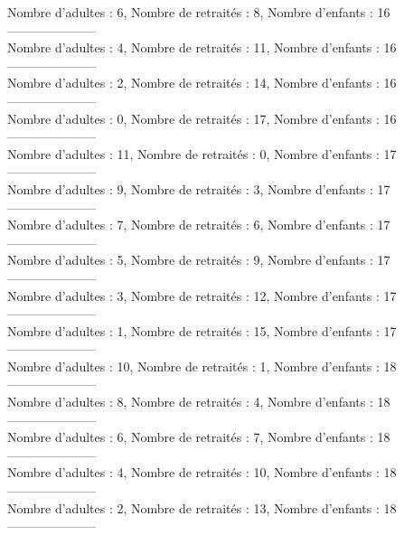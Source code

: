 \documentclass[10pt,a4paper]{article}
\begin{document}
Nombre d'adultes : 6, Nombre de retraités : 8, Nombre d'enfants : 16\\
---------------------\\
Nombre d'adultes : 4, Nombre de retraités : 11, Nombre d'enfants : 16\\
---------------------\\
Nombre d'adultes : 2, Nombre de retraités : 14, Nombre d'enfants : 16\\
---------------------\\
Nombre d'adultes : 0, Nombre de retraités : 17, Nombre d'enfants : 16\\
---------------------\\
Nombre d'adultes : 11, Nombre de retraités : 0, Nombre d'enfants : 17\\
---------------------\\
Nombre d'adultes : 9, Nombre de retraités : 3, Nombre d'enfants : 17\\
---------------------\\
Nombre d'adultes : 7, Nombre de retraités : 6, Nombre d'enfants : 17\\
---------------------\\
Nombre d'adultes : 5, Nombre de retraités : 9, Nombre d'enfants : 17\\
---------------------\\
Nombre d'adultes : 3, Nombre de retraités : 12, Nombre d'enfants : 17\\
---------------------\\
Nombre d'adultes : 1, Nombre de retraités : 15, Nombre d'enfants : 17\\
---------------------\\
Nombre d'adultes : 10, Nombre de retraités : 1, Nombre d'enfants : 18\\
---------------------\\
Nombre d'adultes : 8, Nombre de retraités : 4, Nombre d'enfants : 18\\
---------------------\\
Nombre d'adultes : 6, Nombre de retraités : 7, Nombre d'enfants : 18\\
---------------------\\
Nombre d'adultes : 4, Nombre de retraités : 10, Nombre d'enfants : 18\\
---------------------\\
Nombre d'adultes : 2, Nombre de retraités : 13, Nombre d'enfants : 18\\
---------------------\\
\end{document}
